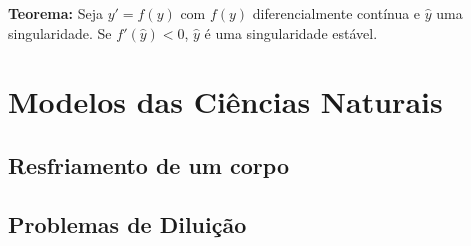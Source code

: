 \documentclass[12pt]{article}
\begin{document}
\textbf{Teorema:} Seja $y' = f(y)$ com $f(y)$ diferencialmente contínua e
$\hat{y}$ uma singularidade. Se $f'(\hat{y}) < 0$, $\hat{y}$ é uma
singularidade estável. 

\section{Modelos das Ciências Naturais}

\subsection{Resfriamento de um corpo}

\subsection{Problemas de Diluição}
\end{document}
